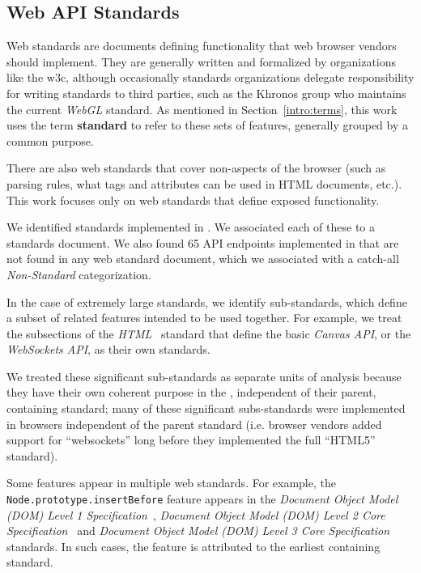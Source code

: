 \subsection{Web API Standards}
\label{measurement:data-sources:method-web-standards}
Web standards are documents defining functionality that web browser vendors
should implement.  They are generally written and formalized by organizations
like the \gls{w3c}, although occasionally standards organizations delegate
responsibility for writing standards to third parties, such as the Khronos
group who maintains the current \textit{WebGL} standard.  As mentioned in
Section~\ref{intro:terms}, this work uses the term \textbf{standard} to refer
to these sets of features, generally grouped by a common purpose.

There are also web standards that cover non-\JS aspects of the browser (such
as parsing rules, what tags and attributes can be used in HTML documents,
etc.). This work focuses only on web standards that define \JS exposed
functionality.

We identified \numstandards standards implemented in \FF.  We associated each
of these to a standards document.  We also found 65 API endpoints implemented
in \FF that are not found in any web standard document, which we associated
with a catch-all \textit{Non-Standard} categorization.

In the case of extremely large standards, we identify sub-standards, which
define a subset of related features intended to be used together.  For example,
we treat the subsections of the \textit{HTML}~\cite{whatwg2018html} standard
that define the basic \textit{Canvas API}, or the \textit{WebSockets API}, as
their own standards.

We treated these significant sub-standards as separate units of analysis
because they have their own coherent purpose in the \WAPI, independent
of their parent, containing standard; many of these significant subs-standards
were implemented in browsers independent of the parent standard (i.e. browser
vendors added support for ``websockets'' long before they implemented the full
``HTML5'' standard).

Some features appear in multiple web standards.  For example, the
\texttt{Node.prototype.insertBefore} feature appears in the \textit{Document
Object Model (DOM) Level 1 Specification}~\cite{dom1w3c}, \textit{Document
Object Model (DOM) Level 2 Core Specification}~\cite{dom2corew3c} and
\textit{Document Object Model (DOM) Level 3 Core
Specification}~\cite{dom3corew3c} standards.  In such cases, the feature is
attributed to the earliest containing standard.


